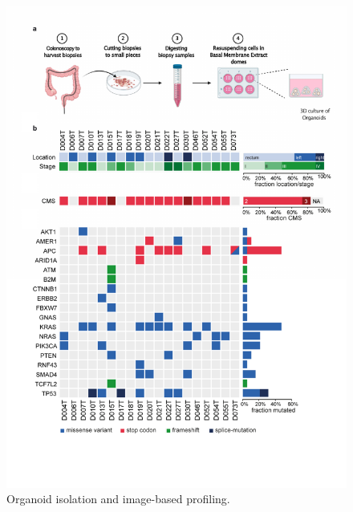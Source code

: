 \begin{flushleft}
\begin{figure}[h]
\centering
\includegraphics[width=\textwidth,
                height=\textheight,
                keepaspectratio]{figures/thesis_organoid_overview.pdf}
\caption{Organoid isolation and image-based profiling.}
\label{S1_mod}
\end{figure}


\end{flushleft}
